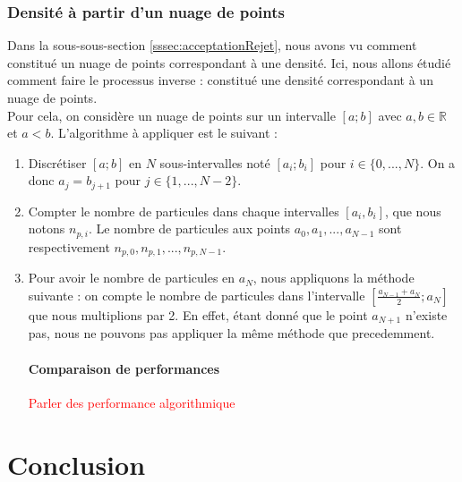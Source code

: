 \documentclass{article}
\begin{document}
\subsubsection{Densité à partir d'un nuage de points}
Dans la sous-sous-section \ref{sssec:acceptationRejet}, nous avons vu comment constitué un nuage de points correspondant à une densité. Ici, nous allons étudié comment faire le processus inverse : constitué une densité correspondant à un nuage de points.\\
Pour cela, on considère un nuage de points sur un intervalle $[a;b]$ avec $a,b \in \mathbb{R}$ et $a < b$. L'algorithme à appliquer est le suivant :
\begin{enumerate}
\item Discrétiser $[a;b]$ en $N$ sous-intervalles noté $[a_i; b_i]$ pour $i \in \{0,...,N\}$. On a donc $a_j = b_{j+1}$ pour $j \in \{1,...,N-2\}$.
\item Compter le nombre de particules dans chaque intervalles $[a_i, b_i]$, que nous notons $n_{p,i}$. Le nombre de particules aux points $a_0, a_1, ...,a_{N-1}$ sont respectivement $n_{p,0}, n_{p,1}, ..., n_{p,N-1}$.
\item Pour avoir le nombre de particules en $a_N$, nous appliquons la méthode suivante : on compte le nombre de particules dans l'intervalle $[\frac {a_{N-1} + a_N} {2}; a_N]$ que nous multiplions par 2. En effet, étant donné que le point $a_{N+1}$ n'existe pas, nous ne pouvons pas appliquer la même méthode que precedemment.
\paragraph{Comparaison de performances}
\textcolor{red}{Parler des performance algorithmique}
\end{enumerate}
\section{Conclusion}
\end{document}
